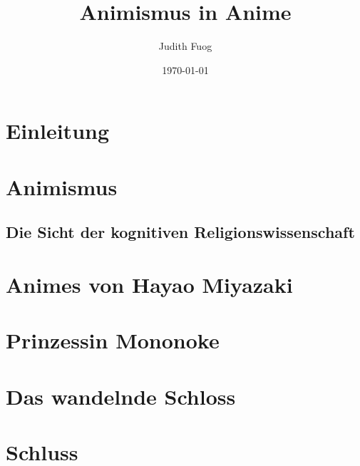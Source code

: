 \documentclass[a4paper]{article}
\title{Animismus in Anime}
\author{Judith Fuog}
\date{\today}
\begin{document}
\maketitle
\tableofcontents
\newpage

\section{Einleitung}


\section{Animismus}

\subsection{Die Sicht der kognitiven Religionswissenschaft}


\section{Animes von Hayao Miyazaki}


\section{Prinzessin Mononoke}


\section{Das wandelnde Schloss}


\section{Schluss}

\end{document}
